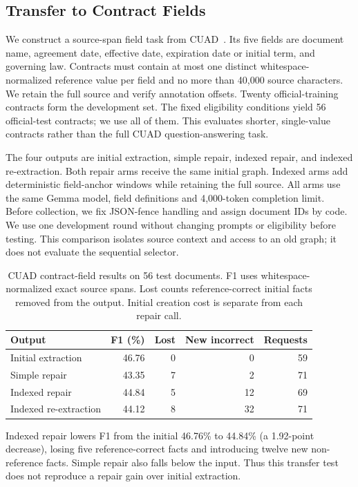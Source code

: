 \subsection{Transfer to Contract Fields}
\label{sec:eval:cuad}
We construct a source-span field task from CUAD~\citep{ref_cuad}. Its five fields are document name, agreement date, effective date, expiration date or initial term, and governing law. Contracts must contain at most one distinct whitespace-normalized reference value per field and no more than 40,000 source characters. We retain the full source and verify annotation offsets. Twenty official-training contracts form the development set. The fixed eligibility conditions yield 56 official-test contracts; we use all of them. This evaluates shorter, single-value contracts rather than the full CUAD question-answering task.

The four outputs are initial extraction, simple repair, indexed repair, and indexed re-extraction. Both repair arms receive the same initial graph. Indexed arms add deterministic field-anchor windows while retaining the full source. All arms use the same Gemma model, field definitions and 4,000-token completion limit. Before collection, we fix JSON-fence handling and assign document IDs by code. We use one development round without changing prompts or eligibility before testing. This comparison isolates source context and access to an old graph; it does not evaluate the sequential selector.
\begin{table}[t]
\centering
\caption{CUAD contract-field results on 56 test documents. F1 uses whitespace-normalized exact source spans. Lost counts reference-correct initial facts removed from the output. Initial creation cost is separate from each repair call.}
\label{tab:cuad}
\small
\begin{tabular}{lrrrr}
\toprule
Output & F1 (\%) & Lost & New incorrect & Requests \\
\midrule
Initial extraction & 46.76 & 0 & 0 & 59 \\
Simple repair & 43.35 & 7 & 2 & 71 \\
Indexed repair & 44.84 & 5 & 12 & 69 \\
Indexed re-extraction & 44.12 & 8 & 32 & 71 \\
\bottomrule
\end{tabular}
\end{table}
Indexed repair lowers F1 from the initial 46.76\% to 44.84\% (a 1.92-point
decrease), losing five reference-correct facts and introducing twelve new
non-reference facts. Simple repair also falls below the input. Thus this
transfer test does not reproduce a repair gain over initial extraction.

